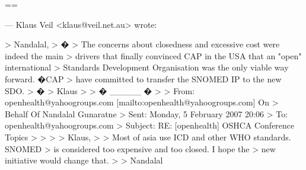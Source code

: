 ==

--- Klaus Veil <klaus@veil.net.au> wrote:

> Nandalal,
> �
> The concerns about closedness and excessive cost were indeed the main
> drivers that finally convinced CAP in the USA that an "open" international
> Standards Development Organisation was the only viable way forward. �CAP
> have committed to transfer the SNOMED IP to the new SDO.
> �
> Klaus
> 
> � _____ �
> 
> From: openhealth@yahoogroups.com [mailto:openhealth@yahoogroups.com] On
> Behalf Of Nandalal Gunaratne
> Sent: Monday, 5 February 2007 20:06
> To: openhealth@yahoogroups.com
> Subject: RE: [openhealth] OSHCA Conference Topics
> 
> 
> 
> Klaus,
> 
> Most of asia use ICD and other WHO standards. SNOMED
> is considered too expensive and too closed. I hope the
> new initiative would change that.
> 
> Nandalal
